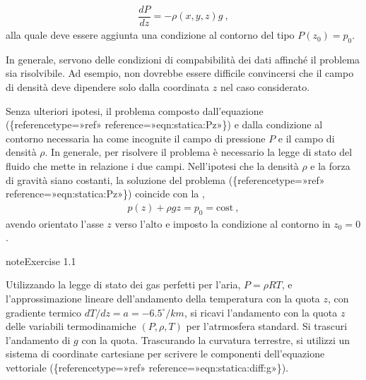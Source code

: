 \documentclass[letterpaper,10pt,italian]{jupyterBook}
\begin{document}
\begin{equation*}
\begin{split}\label{eqn:statica:Pz}
  \dfrac{d P}{d z} = -\rho(x,y,z) g \ ,\end{split}
\end{equation*}
\sphinxAtStartPar
alla quale deve essere
aggiunta una condizione al contorno del tipo \(P(z_0) = p_0\).%
\begin{footnote}[1]\sphinxAtStartFootnote
In generale, servono delle condizioni di compabibilità dei dati
affinché il problema sia risolvibile. Ad esempio, non dovrebbe
essere difficile convincersi che il campo di densità deve dipendere
solo dalla coordinata \(z\) nel caso considerato.
%
\end{footnote} Senza
ulteriori ipotesi, il problema composto dall’equazione
(\{reference\sphinxhyphen{}type=»ref»
reference=»eqn:statica:Pz»\}) e dalla condizione al contorno necessaria
ha come incognite il campo di pressione \(P\) e il campo di densità
\(\rho\). In generale, per risolvere il problema è necessario la legge di
stato del fluido che mette in relazione i due campi. Nell’ipotesi che la
densità \(\rho\) e la forza di gravità siano costanti, la soluzione del
problema (\{reference\sphinxhyphen{}type=»ref»
reference=»eqn:statica:Pz»\}) coincide con la ,
\begin{equation*}
\begin{split}p(z) + \rho g z = p_0 = \text{cost} \ ,\end{split}
\end{equation*}
\sphinxAtStartPar
avendo orientato l’asse \(z\)
verso l’alto e imposto la condizione al contorno in \(z_0 = 0\).
 \label{exercise:polimi/fluidmechanics-ita/template/capitoli/01_statica/02teoria-exercise-0}

\begin{sphinxadmonition}{note}{Exercise 1.1}



\sphinxAtStartPar
Utilizzando la legge di stato dei gas perfetti per l’aria,
\(P = \rho R T\), e l’approssimazione lineare dell’andamento della
temperatura con la quota \(z\), con gradiente termico
\(dT/dz=a=-6.5^\circ/km\), si ricavi l’andamento con la quota \(z\) delle
variabili termodinamiche \((P,\rho, T)\) per l’atrmosfera standard. Si
trascuri l’andamento di \(g\) con la quota. Trascurando la curvatura
terrestre, si utilizzi un sistema di coordinate cartesiane per scrivere
le componenti dell’equazione vettoriale
(\{reference\sphinxhyphen{}type=»ref»
reference=»eqn:statica:diff:g»\}).
\end{sphinxadmonition}
 \label{exercise:polimi/fluidmechanics-ita/template/capitoli/01_statica/02teoria-exercise-1}
\end{document}
